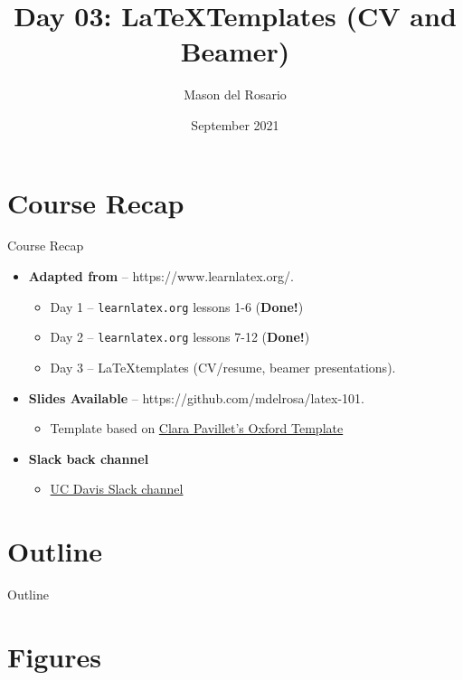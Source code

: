 \documentclass{beamer}
\title{Day 03: \LaTeX Templates (CV and Beamer)}
\author{\small{Mason del Rosario}}
\institute{\LaTeX 101}
\date{September 2021} %
\begin{document}
\footnotesize{
% 


{ 
\frame{\titlepage}}

  \section*{Course Recap}

  \begin{frame}{Course Recap}
    \begin{itemize} 
      \item \textbf{Adapted from} -- https://www.learnlatex.org/. 
        \begin{itemize}
          \item Day 1 -- \texttt{learnlatex.org} lessons 1-6 (\textbf{Done!})
          \item Day 2 -- \texttt{learnlatex.org} lessons 7-12 (\textbf{Done!})
          \item Day 3 -- \LaTeX templates (CV/resume, beamer presentations).
        \end{itemize}
      \item \textbf{Slides Available} -- https://github.com/mdelrosa/latex-101.
      \begin{itemize}
        \item Template based on \href{https://www.overleaf.com/latex/templates/oxpav/xnjgrxthvjhg}{Clara Pavillet's Oxford Template}
      \end{itemize}
      \item \textbf{Slack back channel}
      \begin{itemize}
        \item \href{https://join.slack.com/share/zt-ul82okyc-SI2GftuwPx_lFyBXll9rjw}{UC Davis Slack channel}
      \end{itemize}
    \end{itemize}
  \end{frame}

  \section*{Outline}\begin{frame}{Outline}\tableofcontents\end{frame}

  \section{Figures}

}
\end{document}
